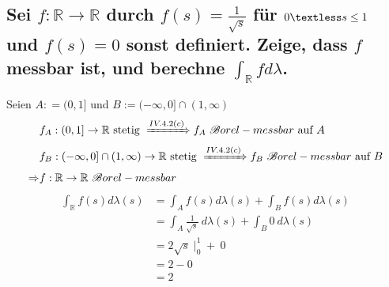 \documentclass[12pt,a4paper]{article}
\begin{document}
\subsection*{Sei $f: \mathbb{R} \rightarrow \mathbb{R}$ durch $f(s) = \frac{1}{\sqrt s}$ für $0 \textless s \leq 1$ und $f(s) = 0$ sonst definiert. Zeige, dass $f$ messbar ist, und berechne $\int_\mathbb{R} f d\lambda$.}
Seien $A: = (0,1]$ und $B:= (-\infty,0] \cap (1,\infty)$
\begin{align*}
	&f_A: (0,1] \rightarrow \mathbb{R} \text{ stetig } \xRightarrow{IV.4.2(c)} f_A\  \mathscr{B}orel-messbar \text{ auf } A\\
	&f_B: (-\infty,0] \cap (1,\infty) \rightarrow \mathbb{R} \text{ stetig } \xRightarrow{IV.4.2(c)}  f_B \ \mathscr{B}orel-messbar \text{ auf }  B\\
	\Rightarrow & f:\mathbb{R} \rightarrow \mathbb{R} \ \mathscr{B}orel-messbar 
\end{align*}
\begin{align*}
	\int_\mathbb{R} f(s) d\lambda(s)&=\int_A f(s) d\lambda(s) + \int_B f(s) d\lambda(s)\\
	&= \int_A \frac{1}{\sqrt s}\ d\lambda(s)+ \int_B 0\ d\lambda(s)\\
	&= 2\sqrt{s} \mid_{0}^{1} + \ 0\\
	&=2 - 0 \\
	&=2
\end{align*}
\end{document}

